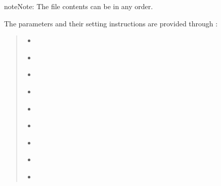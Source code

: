 \documentclass[letterpaper,10pt,english]{sphinxmanual}
\begin{document}
\begin{sphinxadmonition}{note}{Note:}
The file contents can be in any order.
\end{sphinxadmonition}

The parameters and their setting instructions
are provided through {\hyperref[\detokenize{input_files/CBL_input/CBLinput:cblinput}]{}}:
\begin{quote}
\begin{itemize}\setlength{\itemsep}{0pt}\setlength{\parskip}{0pt}
\item {} 
{\hyperref[\detokenize{input_files/CBL_input/CBLinput:cmdoption-arg-entrainmenttype}]{}}

\item {} 
{\hyperref[\detokenize{input_files/CBL_input/CBLinput:cmdoption-arg-qh-choice}]{}}

\item {} 
{\hyperref[\detokenize{input_files/CBL_input/CBLinput:cmdoption-arg-initialdata-use}]{}}

\item {} 
{\hyperref[\detokenize{input_files/CBL_input/CBLinput:cmdoption-arg-sondeflag}]{}}

\item {} 
{\hyperref[\detokenize{input_files/CBL_input/CBLinput:cmdoption-arg-cblday-id}]{}}

\item {} 
{\hyperref[\detokenize{input_files/CBL_input/CBLinput:cmdoption-arg-co2-included}]{}}

\item {} 
{\hyperref[\detokenize{input_files/CBL_input/CBLinput:cmdoption-arg-filesonde-id}]{}}

\item {} 
{\hyperref[\detokenize{input_files/CBL_input/CBLinput:cmdoption-arg-initialdatafilename}]{}}

\item {} 
{\hyperref[\detokenize{input_files/CBL_input/CBLinput:cmdoption-arg-wsb}]{}}

\end{itemize}
\end{quote}
\end{document}
